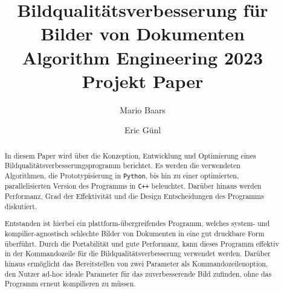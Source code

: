 \documentclass[sigconf]{acmart}
\begin{document}
\title[Bildqualitätsverbesserung für Bilder von Dokumenten]
{Bildqualitätsverbesserung für Bilder von Dokumenten \\\large
  Algorithm Engineering 2023 Projekt Paper}

\author{Mario Baars} 

\author{Eric Günl} 

\begin{abstract}
  In diesem Paper wird über die Konzeption, Entwicklung und
  Optimierung eines Bildqualitätsverbesserungsprogramm berichtet. Es
  werden die verwendeten Algorithmen, die Prototypisierung in
  \texttt{Python}, bis hin zu einer optimierten, parallelisierten
  Version des Programms in \texttt{C++} beleuchtet. Darüber hinaus
  werden Performanz, Grad der Effektivität und die Design
  Entscheidungen des Programms diskutiert.
  
  Entstanden ist hierbei ein plattform-übergreifendes Programm,
  welches system- und kompilier-agnostisch schlechte Bilder von Dokumenten
  in eine gut druckbare Form überführt. Durch die Portabilität und
  gute Performanz, kann dieses Programm effektiv in der Kommandozeile
  für die Bildqualitätsverbesserung verwendet werden. Darüber hinaus
  ermöglicht das Bereitstellen von zwei Parameter als
  Kommandozeilenoption, den Nutzer ad-hoc ideale Parameter für das
  zuverbesserende Bild zufinden, ohne das Programm erneut kompilieren
  zu müssen.
\end{abstract}


\maketitle

\let\thefootnote\relax{}
\end{document}
